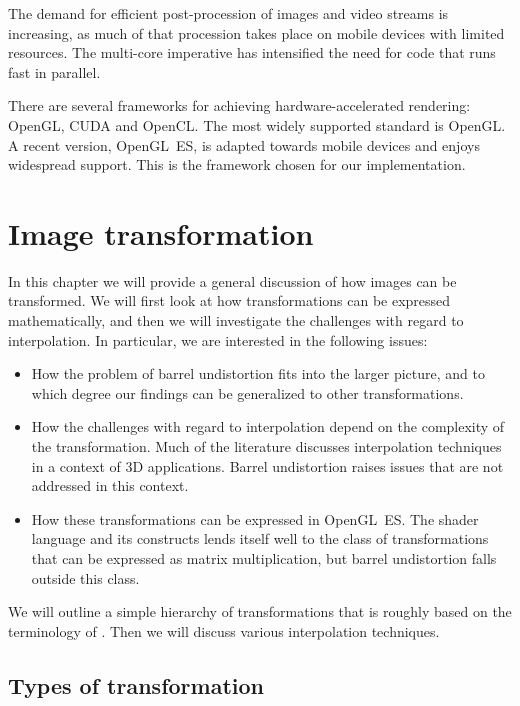 \documentclass[english,12pt]{ifimaster}
\begin{document}
The demand for efficient post-procession of images and video streams
is increasing, as much of that procession takes place on mobile
devices with limited resources. The multi-core imperative has
intensified the need for code that runs fast in parallel.

There are several frameworks for achieving hardware-accelerated
rendering: OpenGL, CUDA and OpenCL. The most widely supported standard
is OpenGL. A recent version, OpenGL~ES, is adapted towards mobile
devices and enjoys widespread support. This is the framework chosen
for our implementation.

\chapter{Image transformation}
\label{chap:trans}

In this chapter we will provide a general discussion of how images can
be transformed. We will first look at how transformations can be
expressed mathematically, and then we will investigate the challenges
with regard to interpolation. In particular, we are interested in the
following issues:
\begin{itemize}
\item How the problem of barrel undistortion fits into the larger
  picture, and to which degree our findings can be generalized to
  other transformations.
\item How the challenges with regard to interpolation depend on the
  complexity of the transformation. Much of the literature discusses
  interpolation techniques in a context of 3D applications. Barrel
  undistortion raises issues that are not addressed in this context.
\item How these transformations can be expressed in OpenGL~ES. The
  shader language and its constructs lends itself well to the class of
  transformations that can be expressed as matrix multiplication, but
  barrel undistortion falls outside this class.
\end{itemize}
We will outline a simple hierarchy of transformations that is roughly
based on the terminology of \citet{wolberg90:-digital-image-warp}.
Then we will discuss various interpolation techniques.

\section{Types of transformation}
\end{document}
